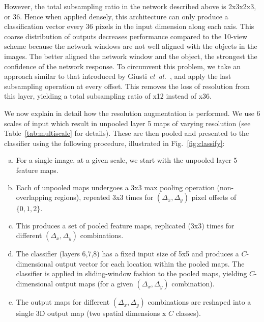 \documentclass{article} %
\newcommand{\fig}[1]{Fig.~\ref{fig:#1}}
\newcommand{\tab}[1]{Table~\ref{tab:#1}}
\def\etal{{\textit{et~al.~}}}
\begin{document}
However, the total subsampling ratio in the network described above is 2x3x2x3, or 36.
Hence when applied densely, this architecture can only produce a classification vector
every 36 pixels in the input dimension along each axis. This coarse distribution
of outputs decreases performance compared to the 10-view scheme because
the network windows are not well aligned with the objects in the images.
The better aligned the network window and the object, the strongest the confidence
of the network response. To circumvent this problem, we take an approach
similar to that introduced by Giusti \etal \cite{giusti-ijcnn-13}, and apply the last subsampling
operation at every offset.  This removes the loss of resolution from this layer,
yielding a total subsampling ratio of x12 instead of x36.

We now explain in detail how the resolution augmentation is performed.
We use 6 scales of input which result in unpooled layer 5 maps of
varying resolution (see \tab{multiscale} for details). These are then
pooled and presented to the classifier using the following procedure,
illustrated in \fig{classify}:
\begin{enumerate}[(a)]
\item For a single image, at a given scale, we start with the unpooled layer 5
  feature maps.  
\vspace{-2mm}
\item Each of unpooled maps undergoes a 3x3 max pooling operation
(non-overlapping regions), repeated 3x3 times for $(\Delta_x,\Delta_y)$
pixel offsets of $\{0,1,2\}$.
\vspace{-2mm}
\item This produces a set of pooled feature maps, replicated (3x3)
  times for different $(\Delta_x,\Delta_y)$ combinations.
\vspace{-2mm}
\item  The classifier (layers 6,7,8) has a fixed input size of 5x5 and
produces a $C$-dimensional output vector for each location within the
pooled maps. The classifier is applied in sliding-window fashion to the pooled
maps, yielding $C$-dimensional output maps (for a given
$(\Delta_x,\Delta_y)$ combination).
\vspace{-2mm}
\item The output maps for different $(\Delta_x,\Delta_y)$ combinations
  are reshaped into a single 3D output map (two spatial dimensions x
  $C$ classes).
\end{enumerate}
\end{document}
